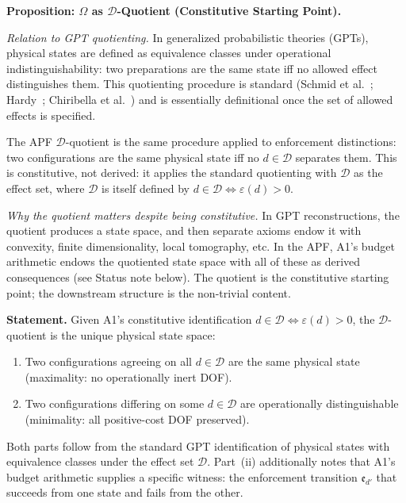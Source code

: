 \documentclass[11pt]{article}
\theoremstyle{remark}
\begin{document}
\medskip\noindent\textbf{Proposition: $\Omega$ as $\mathcal{D}$-Quotient (Constitutive Starting Point).}
\label{prop:D_quotient_forced}

\noindent\textit{Relation to GPT quotienting.}  In generalized probabilistic theories (GPTs), physical states are defined as equivalence classes under operational indistinguishability: two preparations are the same state iff no allowed effect distinguishes them.  This quotienting procedure is standard (Schmid et al.~\cite{Schmid2021}; Hardy~\cite{Hardy2001}; Chiribella et al.~\cite{CDP2011}) and is essentially definitional once the set of allowed effects is specified.

The APF $\mathcal{D}$-quotient is the same procedure applied to enforcement distinctions: two configurations are the same physical state iff no $d \in \mathcal{D}$ separates them.  This is constitutive, not derived: it applies the standard quotienting with $\mathcal{D}$ as the effect set, where $\mathcal{D}$ is itself defined by $d \in \mathcal{D} \Leftrightarrow \varepsilon(d) > 0$.

\textit{Why the quotient matters despite being constitutive.}  In GPT reconstructions, the quotient produces a state space, and then separate axioms endow it with convexity, finite dimensionality, local tomography, etc.  In the APF, A1's budget arithmetic endows the quotiented state space with all of these as derived consequences (see Status note below).  The quotient is the constitutive starting point; the downstream structure is the non-trivial content.

\medskip
\textbf{Statement.}  Given A1's constitutive identification $d \in \mathcal{D} \Leftrightarrow \varepsilon(d) > 0$, the $\mathcal{D}$-quotient is the unique physical state space:
\begin{enumerate}[nosep,leftmargin=2em,itemsep=2pt,label=(\roman*)]
\item Two configurations agreeing on all $d \in \mathcal{D}$ are the same physical state (maximality: no operationally inert DOF).
\item Two configurations differing on some $d \in \mathcal{D}$ are operationally distinguishable (minimality: all positive-cost DOF preserved).
\end{enumerate}
Both parts follow from the standard GPT identification of physical states with equivalence classes under the effect set $\mathcal{D}$.  Part~(ii) additionally notes that A1's budget arithmetic supplies a specific witness: the enforcement transition $\mathfrak{e}_{d'}$ that succeeds from one state and fails from the other.
\end{document}
